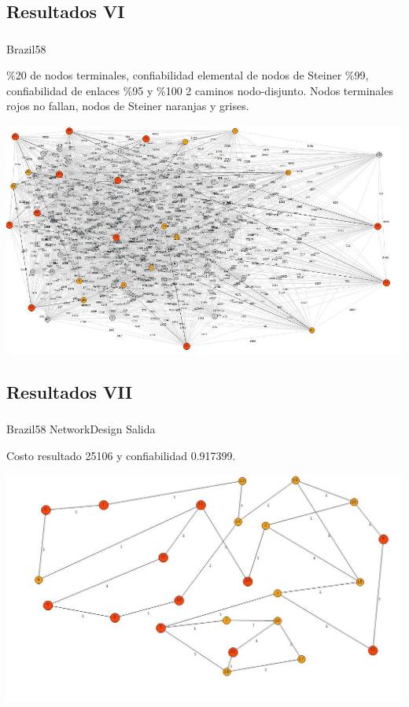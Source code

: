 \subsection{Resultados VI}
\begin{frame}\frametitle{}
\begin{block}{Brazil58}
\begin{scriptsize}
\%20 de nodos terminales, confiabilidad elemental de nodos de Steiner \%99, confiabilidad de enlaces \%95 y \%100 2 caminos nodo-disjunto. Nodos terminales rojos no fallan, nodos de Steiner naranjas y grises.
\end{scriptsize}
\begin{center}
   \includegraphics[scale=0.35]{figuras/1}
\end{center}
\end{block}
\end{frame}

\subsection{Resultados VII}
\begin{frame}\frametitle{}
\begin{block}{Brazil58 NetworkDesign Salida}
\begin{scriptsize}
Costo resultado 25106 y confiabilidad 0.917399. 
\end{scriptsize}
\begin{center}
   \includegraphics[scale=0.35]{figuras/2}
\end{center}
\end{block}
\end{frame}

